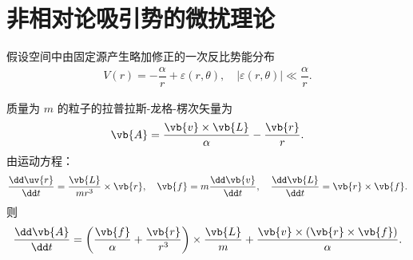 \section{非相对论吸引势的微扰理论}
假设空间中由固定源产生略加修正的一次反比势能分布
\begin{align*}
	V(r) = -\dfrac{\alpha}{r} + \varepsilon(r, \theta),\quad |\varepsilon(r, \theta)| \ll \dfrac{\alpha}{r}.
\end{align*}

质量为 \(m\) 的粒子的拉普拉斯-龙格-楞次矢量为
\begin{align*}
	\vb{A} = \dfrac{\vb{v} \times \vb{L}}{\alpha} - \dfrac{\vb{r}}{r}.
\end{align*}
由运动方程：
\begin{align*}
	\dfrac{\dd \uv{r}}{\dd t} = \dfrac{\vb{L}}{m r^3} \times \vb{r}, \quad
	\vb{f} = m \dfrac{\dd \vb{v}}{\dd t}, \quad
	\dfrac{\dd \vb{L}}{\dd t} = \vb{r} \times \vb{f}.
\end{align*}
则
\begin{align*}
	\dfrac{\dd \vb{A}}{\dd t} = \left( \dfrac{\vb{f}}{\alpha} + \dfrac{\vb{r}}{r^3} \right) \times \dfrac{\vb{L}}{m} + \dfrac{\vb{v} \times (\vb{r} \times \vb{f})}{\alpha}.
\end{align*}

